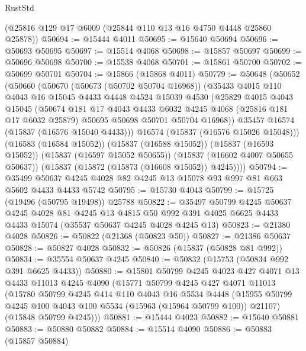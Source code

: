 \begin{lexlean}{RustStd}
\begin{coremodule}
    (@25816 @129 @17 @6009 (@25844 @110 @13 @16 @4750 @4448 @25860 @25878))
@50694 := @15444 @4011
@50695 := @15640 @50694
@50696 := @50693 @50695
@50697 := @15514 @4068
@50698 := @15857 @50697
@50699 := @50696 @50698
@50700 := @15538 @4068
@50701 := @15861 @50700
@50702 := @50699 @50701
@50704 := @15866 (@15868 @4011)
@50779 := @50648
    (@50652
      (@50660
        (@50670
          (@50673 (@50702 @50704 @16968))
          (@35433
            @4015
            @110
            @4043
            @16
            @15045
            @4433
            @4448
            @4524
            @15039
            @4530
            (@25829
              @4015
              @4043
              @15045
              (@50674
                @181
                @17
                @4043
                @4433
                @6032
                @4245
                @4068
                (@25816 @181 @17 @6032 @25879)
                @50695
                @50698
                @50701
                @50704
                @16968))
            @35457
            @16574
            (@15837 (@16576 @15040 @4433)))
          @16574
          (@15837 (@16576 @15026 @15048)))
        (@16583 (@16584 @15052))
        (@15837 (@16588 @15052))
        (@15837 (@16593 @15052))
        (@15837 (@16597 @15052 @50655))
        (@15837 (@16602 @4007 @50655 @50637))
        (@15837 (@15872 (@15873 (@16608 @15052)) @4245))))
@50794 := @35499 @50637 @4245 @4028 @82 @4245 @13 @15078 @93 @997 @81 @663 @5602 @4433 @4433 @5742
@50795 := @15730 @4043
@50799 := @15725 (@19496 (@50795 @19498)) @25788
@50822 := @35497
    @50799
    @4245
    @50637
    @4245
    @4028
    @81
    @4245
    @13
    @4815
    @50
    @992
    @391
    @4025
    @6625
    @4433
    @4433
    @15074
    (@35537 @50637 @4245 @4028 @4245 @13)
@50823 := @21380 @4028
@50826 := @50822 (@21368 (@50823 @50))
@50827 := @21386 @50637
@50828 := @50827 @4028
@50832 := @50826 (@15837 (@50828 @81 @992))
@50834 := @35554 @50637 @4245
@50840 := @50832 (@15753 (@50834 @992 @391 @6625 @4433))
@50880 := @15801
    @50799
    @4245
    @4023
    @427
    @4071
    @13
    @4433
    @11013
    @4245
    @4090
    (@15771
      @50799
      @4245
      @427
      @4071
      @11013
      (@15780
        @50799
        @4245
        @414
        @110
        @4043
        @16
        @5534
        @4448
        (@15955 @50799 @4245 @100 @4043 @100 @5534 (@15963 (@15964 @50799 @100)) @21107)
        (@15848 @50799 @4245)))
@50881 := @15444 @4023
@50882 := @15640 @50881
@50883 := @50880 @50882
@50884 := @15514 @4090
@50886 := @50883 (@15857 @50884)

\end{coremodule}
\end{lexlean}
